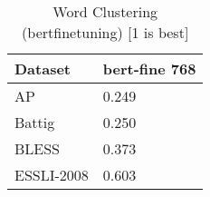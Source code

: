 \begin{table}[]
\centering
\begin{tabular}{l|l}
\hline
Dataset & bert-fine 768 \\
\hline
AP & 0.249 \\ 
Battig & 0.250 \\ 
BLESS & 0.373 \\ 
ESSLI-2008 & 0.603
\end{tabular}
\caption{Word Clustering (bertfinetuning) [1 is best]}
\label{tab:cluster-bertfinetuning}
\end{table}
